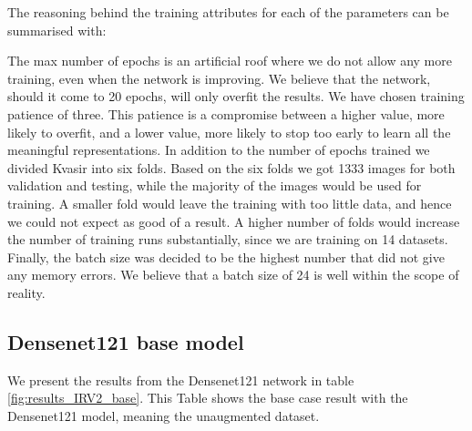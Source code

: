 The reasoning behind the training attributes for each of the parameters can be summarised with:

The max number of epochs is an artificial roof where we do not allow any more training, even when the network is improving.  We believe that the network, should it come to 20 epochs, will only overfit the results.
We have chosen training patience of three. This patience is a compromise between a higher value, more likely to overfit, and a lower value, more likely to stop too early to learn all the meaningful representations. 
In addition to the number of epochs trained we divided Kvasir into six folds. Based on the six folds we got 1333 images for both validation and testing, while the majority of the images would be used for training. A smaller fold would leave the training with too little data, and hence we could not expect as good of a result. A higher number of folds would increase the number of training runs substantially, since we are training on 14 datasets.
Finally, the batch size was decided to be the highest number that did not give any memory errors.  We believe that a batch size of 24 is well within the scope of reality.

\FloatBarrier
\subsection{Densenet121 base model}
We present the results from  the Densenet121 network in table \ref{fig:results_IRV2_base}.
This Table shows the base case result with the Densenet121 model, meaning the unaugmented dataset. 

